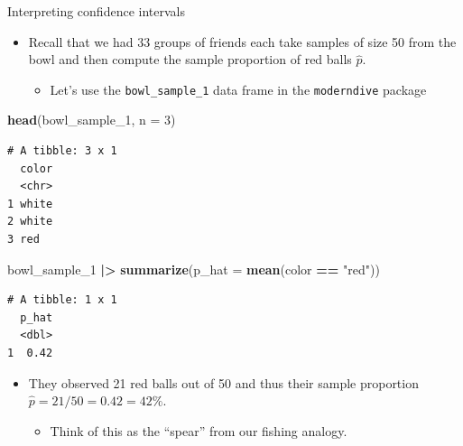 \documentclass[
  ignorenonframetext,
]{beamer}
\newenvironment{Shaded}{\begin{snugshade}}{\end{snugshade}}
\newcommand{\AttributeTok}[1]{\textcolor[rgb]{0.13,0.29,0.53}{#1}}
\newcommand{\DecValTok}[1]{\textcolor[rgb]{0.00,0.00,0.81}{#1}}
\newcommand{\FunctionTok}[1]{\textcolor[rgb]{0.13,0.29,0.53}{\textbf{#1}}}
\newcommand{\NormalTok}[1]{#1}
\newcommand{\SpecialCharTok}[1]{\textcolor[rgb]{0.81,0.36,0.00}{\textbf{#1}}}
\newcommand{\StringTok}[1]{\textcolor[rgb]{0.31,0.60,0.02}{#1}}
\providecommand{\tightlist}{%
  \setlength{\itemsep}{0pt}\setlength{\parskip}{0pt}}
\begin{document}
\begin{frame}[fragile]{Interpreting confidence intervals}
\label{interpreting-confidence-intervals-3}
\begin{itemize}
\item
  Recall that we had 33 groups of friends each take samples of size 50
  from the bowl and then compute the sample proportion of red balls
  \(\hat{p}\).

  \begin{itemize}
  \tightlist
  \item
    Let's use the \texttt{bowl\_sample\_1} data frame in the
    \texttt{moderndive} package
  \end{itemize}
\end{itemize}

\small

\begin{Shaded}
\begin{Highlighting}[]
\FunctionTok{head}\NormalTok{(bowl\_sample\_1, }\AttributeTok{n =} \DecValTok{3}\NormalTok{)}
\end{Highlighting}
\end{Shaded}

\begin{verbatim}
# A tibble: 3 x 1
  color
  <chr>
1 white
2 white
3 red  
\end{verbatim}

\begin{Shaded}
\begin{Highlighting}[]
\NormalTok{bowl\_sample\_1 }\SpecialCharTok{|\textgreater{}} 
  \FunctionTok{summarize}\NormalTok{(}\AttributeTok{p\_hat =} \FunctionTok{mean}\NormalTok{(color }\SpecialCharTok{==} \StringTok{"red"}\NormalTok{))}
\end{Highlighting}
\end{Shaded}

\begin{verbatim}
# A tibble: 1 x 1
  p_hat
  <dbl>
1  0.42
\end{verbatim}

\normalsize

\begin{itemize}
\item
  They observed 21 red balls out of 50 and thus their sample proportion
  \(\hat{p}=21/50 = 0.42 = 42\%\).

  \begin{itemize}
  \tightlist
  \item
    Think of this as the ``spear'' from our fishing analogy.
  \end{itemize}
\end{itemize}
\end{frame}
\end{document}

